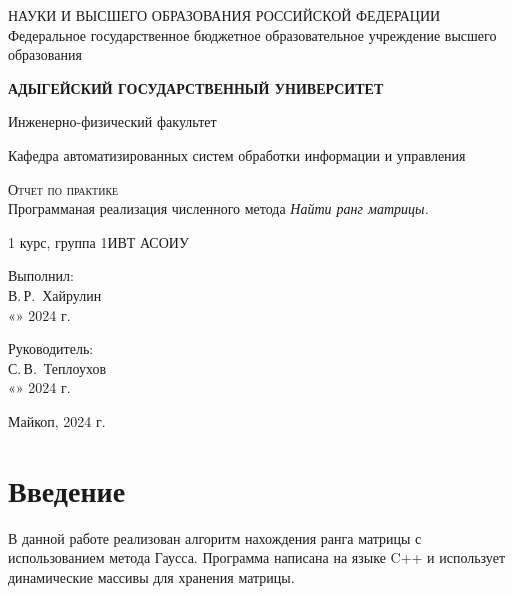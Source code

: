 \documentclass[12pt,a4paper]{scrartcl}
\begin{document}
	\begin{titlepage}
		\begin{center}
			 НАУКИ И ВЫСШЕГО ОБРАЗОВАНИЯ РОССИЙСКОЙ ФЕДЕРАЦИИ
			Федеральное государственное бюджетное образовательное учреждение высшего образования
			
			\textbf{АДЫГЕЙСКИЙ ГОСУДАРСТВЕННЫЙ УНИВЕРСИТЕТ}
			\vspace{0.25cm}
			
			Инженерно-физический факультет
			
			Кафедра автоматизированных систем обработки информации и управления
			\vfill

			\vfill
			
			\textsc{Отчет по практике}\\[5mm]
			
			{\LARGE Программаная реализация численного метода \textit{Найти ранг матрицы.}}
			\bigskip
			
			1 курс, группа 1ИВТ АСОИУ
		\end{center}
		\vfill
		
		\newlength{\ML}
		\hfill\begin{minipage}{0.5\textwidth}
			Выполнил:\\
			\underline{\hspace{\ML}} В.\,Р.~Хайрулин\\
			«\underline{\hspace{0.7cm}}» \underline{\hspace{2cm}} 2024 г.
		\end{minipage}%
		\bigskip
		
		\hfill\begin{minipage}{0.5\textwidth}
			Руководитель:\\
			\underline{\hspace{\ML}} С.\,В.~Теплоухов\\
			«\underline{\hspace{0.7cm}}» \underline{\hspace{2cm}} 2024 г.
		\end{minipage}%
		\vfill
		
		\begin{center}
			Майкоп, 2024 г.
		\end{center}
	\end{titlepage}

\section*{Введение}
В данной работе реализован алгоритм нахождения ранга матрицы с использованием метода Гаусса. Программа написана на языке C++ и использует динамические массивы для хранения матрицы.
\end{document}
